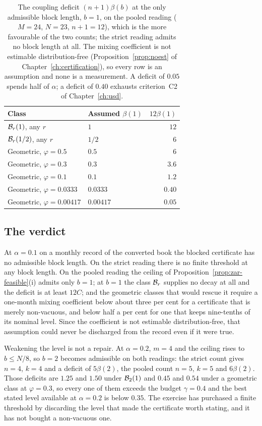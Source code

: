 \documentclass[../../../main.tex]{subfiles}
\begin{document}
\begin{table}[htbp]\centering\small
\caption{The coupling deficit $(n+1)\beta(b)$ at the only admissible block length, $b=1$, on the pooled reading ($M=24$, $N=23$, $n+1=12$), which is the more favourable of the two counts; the strict reading admits no block length at all. The mixing coefficient is not estimable distribution-free (Proposition~\ref{prop:noest} of Chapter~\ref{ch:certification}), so every row is an assumption and none is a measurement. A deficit of $0.05$ spends half of $\alpha$; a deficit of $0.40$ exhausts criterion~C2 of Chapter~\ref{ch:usd}.}\label{tab:zar-geom}
\begin{tabular}{@{}llr@{}}
\toprule
Class & Assumed $\beta(1)$ & $12\beta(1)$ \\
\midrule
$\mathcal B_{r}(1)$, any $r$ & $1$ & $12$ \\
$\mathcal B_{r}(1/2)$, any $r$ & $1/2$ & $6$ \\
Geometric, $\varphi=0.5$ & $0.5$ & $6$ \\
Geometric, $\varphi=0.3$ & $0.3$ & $3.6$ \\
Geometric, $\varphi=0.1$ & $0.1$ & $1.2$ \\
Geometric, $\varphi=0.0333$ & $0.0333$ & $0.40$ \\
Geometric, $\varphi=0.00417$ & $0.00417$ & $0.05$ \\
\bottomrule
\end{tabular}
\end{table}

\subsection{The verdict}

At $\alpha=0.1$ on a monthly record of the converted book the blocked certificate has no admissible block length. On the strict reading there is no finite threshold at any block length. On the pooled reading the ceiling of Proposition~\ref{prop:zar-feasible}(i) admits only $b=1$; at $b=1$ the class $\mathcal B_{r}$ supplies no decay at all and the deficit is at least $12C$; and the geometric classes that would rescue it require a one-month mixing coefficient below about three per cent for a certificate that is merely non-vacuous, and below half a per cent for one that keeps nine-tenths of its nominal level. Since the coefficient is not estimable distribution-free, that assumption could never be discharged from the record even if it were true.

Weakening the level is not a repair. At $\alpha=0.2$, $m=4$ and the ceiling rises to $b\le N/8$, so $b=2$ becomes admissible on both readings: the strict count gives $n=4$, $k=4$ and a deficit of $5\beta(2)$, the pooled count $n=5$, $k=5$ and $6\beta(2)$. Those deficits are $1.25$ and $1.50$ under $\mathcal B_{2}(1)$ and $0.45$ and $0.54$ under a geometric class at $\varphi=0.3$, so every one of them exceeds the budget $\gamma=0.4$ and the best stated level available at $\alpha=0.2$ is below $0.35$. The exercise has purchased a finite threshold by discarding the level that made the certificate worth stating, and it has not bought a non-vacuous one.
\end{document}
